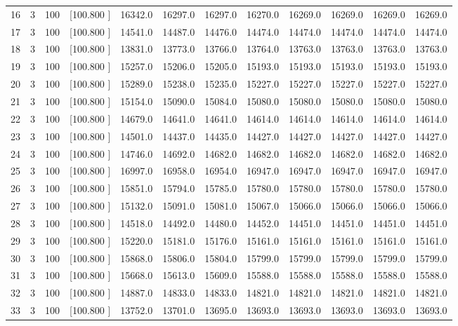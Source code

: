 \documentclass[12pt,a4paper]{article}
\begin{document}
\begin{center}
{\begin{tabular}{r r r r r r r r r r r r}
  16&  3&100&[100.800   ]& 16342.0& 16297.0& 16297.0& 16270.0& 16269.0& 16269.0& 16269.0& 16269.0\\[-0.02in]
  17&  3&100&[100.800   ]& 14541.0& 14487.0& 14476.0& 14474.0& 14474.0& 14474.0& 14474.0& 14474.0\\[-0.02in]
  18&  3&100&[100.800   ]& 13831.0& 13773.0& 13766.0& 13764.0& 13763.0& 13763.0& 13763.0& 13763.0\\[-0.02in]
  19&  3&100&[100.800   ]& 15257.0& 15206.0& 15205.0& 15193.0& 15193.0& 15193.0& 15193.0& 15193.0\\[-0.02in]
  20&  3&100&[100.800   ]& 15289.0& 15238.0& 15235.0& 15227.0& 15227.0& 15227.0& 15227.0& 15227.0\\[-0.02in]
  21&  3&100&[100.800   ]& 15154.0& 15090.0& 15084.0& 15080.0& 15080.0& 15080.0& 15080.0& 15080.0\\[-0.02in]
  22&  3&100&[100.800   ]& 14679.0& 14641.0& 14641.0& 14614.0& 14614.0& 14614.0& 14614.0& 14614.0\\[-0.02in]
  23&  3&100&[100.800   ]& 14501.0& 14437.0& 14435.0& 14427.0& 14427.0& 14427.0& 14427.0& 14427.0\\[-0.02in]
  24&  3&100&[100.800   ]& 14746.0& 14692.0& 14682.0& 14682.0& 14682.0& 14682.0& 14682.0& 14682.0\\[-0.02in]
  25&  3&100&[100.800   ]& 16997.0& 16958.0& 16954.0& 16947.0& 16947.0& 16947.0& 16947.0& 16947.0\\[-0.02in]
  26&  3&100&[100.800   ]& 15851.0& 15794.0& 15785.0& 15780.0& 15780.0& 15780.0& 15780.0& 15780.0\\[-0.02in]
  27&  3&100&[100.800   ]& 15132.0& 15091.0& 15081.0& 15067.0& 15066.0& 15066.0& 15066.0& 15066.0\\[-0.02in]
  28&  3&100&[100.800   ]& 14518.0& 14492.0& 14480.0& 14452.0& 14451.0& 14451.0& 14451.0& 14451.0\\[-0.02in]
  29&  3&100&[100.800   ]& 15220.0& 15181.0& 15176.0& 15161.0& 15161.0& 15161.0& 15161.0& 15161.0\\[-0.02in]
  30&  3&100&[100.800   ]& 15868.0& 15806.0& 15804.0& 15799.0& 15799.0& 15799.0& 15799.0& 15799.0\\[-0.02in]
  31&  3&100&[100.800   ]& 15668.0& 15613.0& 15609.0& 15588.0& 15588.0& 15588.0& 15588.0& 15588.0\\[-0.02in]
  32&  3&100&[100.800   ]& 14887.0& 14833.0& 14833.0& 14821.0& 14821.0& 14821.0& 14821.0& 14821.0\\[-0.02in]
  33&  3&100&[100.800   ]& 13752.0& 13701.0& 13695.0& 13693.0& 13693.0& 13693.0& 13693.0& 13693.0\\[-0.02in]

\end{tabular}}
\end{center}
\end{document}
